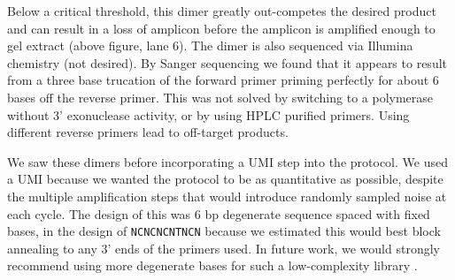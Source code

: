 \afig{
  \texttt{[image: img/exampleDimers.png]}
  }{
\begin{tikzpicture}[overlay
    ,font=\small,%
    ,inner sep=0pt,outer sep=0pt
    ,shift={(0.7,-3)}]
    ]
  \node[align=left] at (-5.8,5) (ladder200) {200bp};
  \node[align=left,below=0.6cm of ladder200] (ladder100) {100bp};
%
  \node[below right=0.025cm and 1cm of ladder200] (200L) {};
  \draw[->] (ladder200) -- (200L);
  \node[above right=0.000cm and 1cm of ladder100] (100L) {};
  \draw[->] (ladder100) -- (100L);
%
  \node[align=left,anchor=south] at (-3.5,5.6) {Ladder\\Lane 1};
  \node[align=left,anchor=south] at (-2.1,5.6) {Lane 2};
  \node[align=left,anchor=south] at (-0.7,5.6) {Lane 3};
  \node[align=left,anchor=south] at (0.7,5.6) {Lane 4};
  \node[align=left,anchor=south] at (2.1,5.6) {Lane 5};
  \node[align=left,anchor=south] at (3.4,5.6) {Lane 6};
\end{tikzpicture}
    This is a 3\% TAE agarose gel, stained with Sybr Safe dye.
    The left-most lane is a NEB 100bp ladder, with the bottom 
    two bands as 100bp and 200bp. The red is due to overexposure.
    The right five bands are from samples prepared with an earlier
    version of this protocol. The band approximately 190bp is
    throught to be the library product, and the band approximately
    160bp is thought to be the inhibitory and unwanted 
    barcode-less dimer. Lane 3 clearly shows both bands, while lane
    6 is all dimer.
  \label{fig:dimer}
  }{An example of a dimer.}

Below a critical threshold, this dimer greatly out-competes the desired
product and can result in a loss of amplicon before the amplicon is
amplified enough to gel extract (above figure, lane 6). The dimer is
also sequenced via Illumina chemistry (not desired). By Sanger
sequencing we found that it appears to result from a three base
trucation of the forward primer priming perfectly for about 6 bases off
the reverse primer. This was not solved by switching to a polymerase
without 3' exonuclease activity, or by using HPLC purified primers.
Using different reverse primers lead to off-target products.

We saw these dimers before incorporating a UMI step into the protocol.
We used a UMI because we wanted the protocol to be as quantitative as
possible, despite the multiple amplification steps that would introduce
randomly sampled noise at each cycle. The design of this was 6 bp
degenerate sequence spaced with fixed bases, in the design of
\texttt{NCNCNCNTNCN} because we estimated this would best block
annealing to any 3' ends of the primers used. In future work, we would
strongly recommend using more degenerate bases for such a low-complexity
library \parencite{fu2011counting}. 

